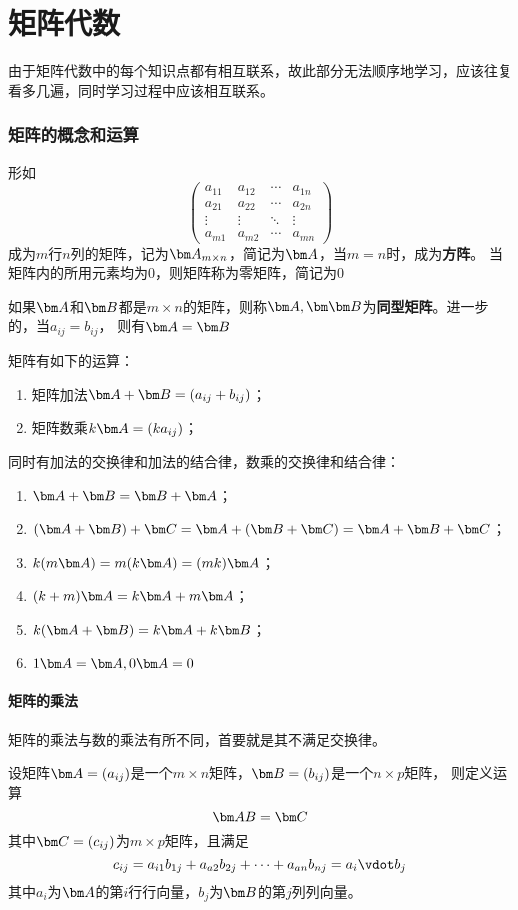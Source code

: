 \part{矩阵代数}
由于矩阵代数中的每个知识点都有相互联系，故此部分无法顺序地学习，应该往复看多几遍，同时学习过程中应该相互联系。
\section{矩阵的概念和运算}
形如
\[
    \begin{pmatrix}
        a_{11} & a_{12} & \cdots & a_{1n} \\
        a_{21} & a_{22} & \cdots & a_{2n} \\
        \vdots & \vdots & \ddots & \vdots \\
        a_{m1} & a_{m2} & \cdots & a_{mn}
    \end{pmatrix}
\]
成为$m$行$n$列的矩阵，记为$\mat{A}_{m\times n}$，简记为$\mat{A}$，当$m=n$时，成为\textbf{\textsf{方阵}}。
当矩阵内的所用元素均为$0$，则矩阵称为零矩阵，简记为$0$

如果$\mat{A}$和$\mat{B}$都是$m\times n$的矩阵，则称$\mat{A},\mat{\mat{B}}$为\textbf{\textsf{同型矩阵}}。进一步的，当$a_{ij}=b_{ij}$，
则有$\mat{A}=\mat{B}$

矩阵有如下的运算：
\begin{enumerate}[(1)]
    \item 矩阵加法$\mat{A}+\mat{B}=(a_{ij}+b_{ij})$；
    \item 矩阵数乘$k\mat{A} = (ka_{ij})$；
\end{enumerate}

同时有加法的交换律和加法的结合律，数乘的交换律和结合律：
\begin{enumerate}[(1)]
    \item $\mat{A}+\mat{B}=\mat{B}+\mat{A}$；
    \item $(\mat{A}+\mat{B})+\mat{C}=\mat{A}+(\mat{B}+\mat{C})=\mat{A}+\mat{B}+\mat{C}$；
    \item $k(m\mat{A}) = m(k\mat{A}) = (mk)\mat{A}$；
    \item $(k+m)\mat{A} = k\mat{A} + m\mat{A}$；
    \item $k(\mat{A}+\mat{B}) = k\mat{A} + k\mat{B}$；
    \item $1\mat{A}=\mat{A}, 0\mat{A} = 0$
\end{enumerate}

\subsection{矩阵的乘法}
矩阵的乘法与数的乘法有所不同，首要就是其不满足交换律。
\begin{definition}
    设矩阵$\mat{A}=(a_{ij})$是一个$m\times n$矩阵，$\mat{B}=(b_{ij})$是一个$n\times p$矩阵，
    则定义运算
    \[ \mat{AB} = \mat{C} \]
    其中$\mat{C}=(c_{ij})$为$m\times p$矩阵，且满足
    \[ c_{ij} = a_{i1}b_{1j} + a_{a2}b_{2j} + \cdots + a_{an}b_{nj} = a_i\vdot b_j \]
    其中$a_i$为$\mat{A}$的第$i$行行向量，$b_j$为$\mat{B}$的第$j$列列向量。
\end{definition}

